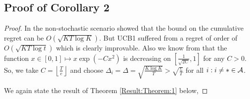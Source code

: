 \subsection{Proof of Corollary 2}
\label{sec:proofTheorem:Corollary2}
\begin{proof}
\label{Proof:Corollary:2}
In the non-stochastic scenario \cite{auer2002nonstochastic} showed that the bound on the cumulative regret can be $O\left(\sqrt{KT\log K}\right)$. But UCB1 suffered from a regret of order of  $O\left(\sqrt{KT\log t}\right)$  which is clearly improvable. Also we know from \citet{bubeck2011pure} that the function $x\in [0,1]\mapsto x\exp(-Cx^2)$ is  decreasing on $\left[\frac{1}{\sqrt{2C}},1\right ]$ for any $C>0$. So, we take $C=\left\lfloor \frac{T}{e}\right\rfloor$ and choose  $\Delta_{i}=\Delta=\sqrt{\frac{K\log K}{T}}>\sqrt{\frac{e}{T}}$ for all ${i:i\neq *}\in \mathcal{A} $.



%
	
	We again state the result of Theorem \ref{Result:Theorem:1} below, 
	

\end{proof}
